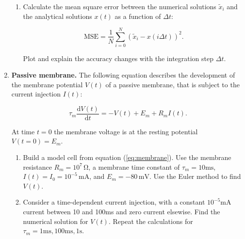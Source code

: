 \documentclass[12pt, a4]{article}
\begin{document}
\begin{enumerate}
\begin{enumerate}
        \item Calculate the mean square error between the
        numerical solutions $\tilde{x}_i$ and the analytical solutions $x(t)$
        as a function of $\Delta t$:
     
        \begin{equation}
            \mathrm{MSE}=\frac{1}{N}
            \sum_{i=0}^N (\tilde{x}_i-x(i\Delta t))^2.  \label{eq:MSE}
        \end{equation}
     
        Plot and explain the accuracy changes with the integration step
        $\Delta t$.
    \end{enumerate}


    \item \textbf{Passive membrane.}\label{ex:membrane} The following 
    equation describes the development of the membrane potential $V(t)$
    of a passive membrane, that is subject to the current injection $I(t)$:

    \begin{equation}
        \tau_m \frac{\mathrm{d}V(t)}{\mathrm{d}t}=-V(t)+E_m+R_mI(t).
        \label{eq:membrane}
    \end{equation} 

    At time $t=0$ the membrane voltage is at the resting potential $V(t=0)=E_m$.

    \begin{enumerate}
        \item Build a model cell from equation (\ref{eq:membrane}). Use the 
	    membrane resistance $R_m=10^7\,\mathrm{ \Omega}$, 
	    a membrane time constant of $\tau_m=10\mathrm{ms}$,
	    $I(t)=I_0=10^{-5}\,\mathrm{ mA}$,
            and $E_m=-80\,\mathrm{mV}$. Use the Euler
            method to find $V(t)$.
        \item Consider a time-dependent current injection, with a constant
            $10^{-5}\mathrm{mA}$ current between 10 and 100ms and zero current
            elsewise.
        Find the numerical solution for $V(t)$. Repeat the calculations for
        $\tau_m=1\mathrm{ms},100\mathrm{ms},1\mathrm{s}$.
    \end{enumerate}


\end{enumerate}
\end{document}
